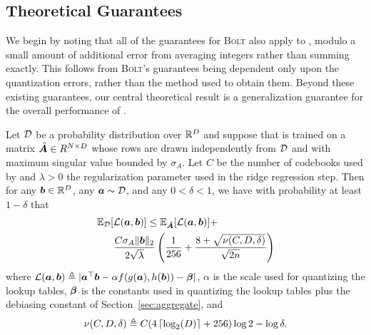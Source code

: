 \vspace{-1mm}
\subsection{Theoretical Guarantees} \label{sec:maddnessMainThm}
\vspace{-1.5mm}

We begin by noting that all of the guarantees for \textsc{Bolt}\text{} also apply to \ours, modulo a small amount of additional error from averaging integers rather than summing exactly. This follows from \textsc{Bolt}'s guarantees being dependent only upon the quantization errors, rather than the method used to obtain them.
Beyond these existing guarantees, our central theoretical result is a generalization guarantee for the overall performance of \ours.

\begin{theorem} \label{thm:maddness}
Let $\mathcal{D}$ be a probability distribution over $\mathbb{R}^D$ and suppose that \oursp is trained on a matrix $\tilde{\bm{A}} \in R^{N \times D}$ whose rows are drawn independently from $\mathcal{D}$ and with maximum singular value bounded by $\sigma_A$. Let $C$ be the number of codebooks used by \oursp and $\lambda > 0$ the regularization parameter used in the ridge regression step. Then for any $\bm{b} \in \mathbb{R}^D$, any $\bm{a} \sim \mathcal{D}$, and any $0 < \delta < 1$, we have with probability at least $1 - \delta$ that
\begin{align}
    \begin{split}
    \mathbb{E}_{\mathcal{D}}[&\mathcal{L}(\bm{a}, \bm{b})] \le \mathbb{E}_{\tilde{\bm{A}}}[\mathcal{L}(\bm{a}, \bm{b})] + \\
    &\frac{C \sigma_A \lVert\bm{b}\rVert_2}{2 \sqrt{\lambda}} \left(
        \frac{1}{256} +
        \frac{
            8 +
            \sqrt{
                \nu(C, D, \delta)
            }
        }{\sqrt{2n}}
    \right)
    \end{split}
\end{align}
where $\mathcal{L}(\bm{a}, \bm{b}) \triangleq |\bm{a}^\top \bm{b} - \alpha f(g(\bm{a}), h(\bm{b})) - \bm{\beta}|$, $\alpha$ is the scale used for quantizing the lookup tables, $\bm{\beta}$ is the constants used in quantizing the lookup tables plus the debiasing constant of Section~\ref{sec:aggregate}, and
\begin{align}
    \nu(C, D, \delta) \triangleq C (4\left \lceil \log_2(D) \right \rceil + 256) \log{2} -\log{\delta}.
\end{align}
\end{theorem}

